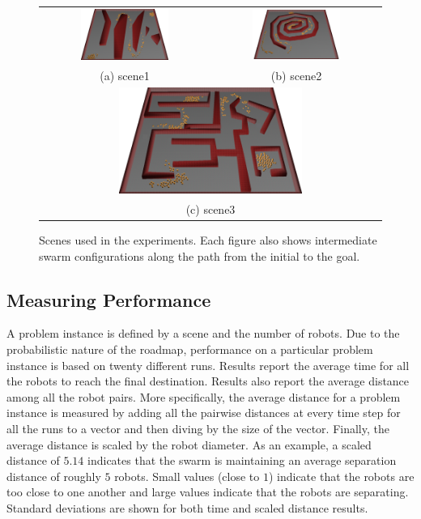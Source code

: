 \documentclass{llncs}
\begin{document}
\begin{figure}
\begin{tabular}{cc}
\includegraphics[width=0.55\textwidth]{m7}&
\includegraphics[width=0.55\textwidth]{scene1}\\
(a) scene1 & (b) scene2\\
\multicolumn{2}{c}{\includegraphics[width=0.55\textwidth]{scene2}}\\
\multicolumn{2}{c}{(c) scene3}
\end{tabular}
\caption{Scenes used in the experiments. Each figure also shows
  intermediate swarm configurations along the path from the initial to
the goal.} 
\label{fig:Scenes}
\end{figure}

\subsection{Measuring Performance}
\label{sec:Measures}
A problem instance is defined by a scene and the number of robots. Due
to the probabilistic nature of the roadmap, performance on a
particular problem instance is based on twenty different runs.
Results report the average time for all the robots to reach the final
destination. Results also report the average distance among all the
robot pairs. More specifically, the average distance for a problem instance is measured by
adding all the pairwise distances at every time step for all the runs
to a vector and then diving by the size of the vector. Finally, the
average distance is scaled by the robot diameter. As an example, a
scaled distance of $5.14$ indicates that the swarm is maintaining an average
separation distance of roughly $5$ robots.  Small values (close to $1$)
indicate that the robots are too close to one another and large values
indicate that the robots are separating. Standard deviations are shown
for both time and scaled distance results.
\end{document}
